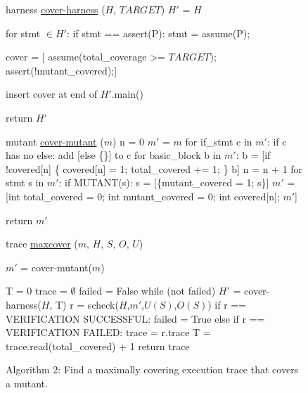 \documentclass{svjour3}
\begin{document}
\begin{figure}
{%
\begin{code}
harness {\underline{cover-harness}} ($H$, $TARGET$) 
\vspace{0.1in}
  $H'$ = $H$

  for stmt $\in H'$:
     if stmt == assert(P):
        stmt = assume(P);

  cover = [
    assume(total\_coverage >= $TARGET$); 
    assert(!mutant\_covered);]

  insert cover at end of $H'$.main() 

  return $H'$
\end{code}

\vspace{0.2in}

\begin{code}
mutant {\underline{cover-mutant}} ($m$) 
\vspace{0.1in}
  n = 0
  $m'$ = $m$
  for if\_stmt c in $m'$:
     if c has no else:
        add [else \{\}] to c
  for basic\_block b in $m'$:
     b = [if !covered[n] \{
             covered[n] = 1;
             total\_covered += 1;
          \}
          b]
     n = n + 1
  for stmt s in $m'$:
     if MUTANT(s):
        s = [\{mutant\_covered = 1;
              s\}]
  $m'$ = [int total\_covered = 0;
        int mutant\_covered = 0;
        int covered[n];
        $m'$]

  return $m'$
\end{code}

\vspace{0.2in}

\begin{code}
trace {\underline{maxcover}} ($m$, $H$, $S$, $O$, $U$) 
\vspace{0.1in}

  $m'$ = cover-mutant($m$)

  T = 0
  trace = $\emptyset$
  failed = False
  while (not failed)
     $H'$ = cover-harness($H$, T)
     r = scheck($H$,$m'$,$U(S)$,$O(S)$)
     if r == VERIFICATION SUCCESSFUL:
       failed = True
     else if r == VERIFICATION FAILED:
       trace = r.trace
       T = trace.read(total\_covered) + 1
  return trace
\end{code}
}
\caption{Algorithm 2: Find a maximally covering execution trace that
  covers a mutant.}
\label{alg:maxcover}
\end{figure}
\end{document}
